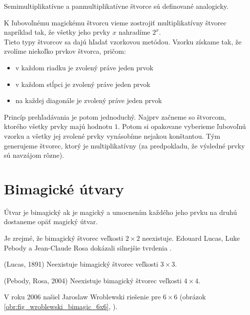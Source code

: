 \begin{note} Semimultiplikatívne a panmultiplikatívne štvorce sú definované analogicky.
\end{note}

K ľubovoľnému magickému štvorcu vieme zostrojiť multiplikatívny štvorec napríklad tak, že všetky jeho prvky $x$ nahradíme $2^x$. \\

Tieto typy štvorcov sa dajú hľadať vzorkovou metódou. Vzorku získame tak, že zvolíme niekoľko prvkov štvorca, pričom:
\begin{itemize}
\item v každom riadku je zvolený práve jeden prvok
\item v každom stĺpci je zvolený práve jeden prvok
\item na každej diagonále je zvolený práve jeden prvok
\end{itemize}

Princíp prehľadávania je potom jednoduchý. Najprv začneme so štvorcom, ktorého všetky prvky majú hodnotu $1$. Potom si opakovane vyberieme ľubovoľnú vzorku a všetky jej zvolené prvky vynásobíme nejakou konštantou. Tým generujeme štvorec, ktorý je multiplikatívny (za predpokladu, že výsledné prvky sú navzájom rôzne). \\

\section{Bimagické útvary}
\begin{definition} Útvar je bimagický ak je magický a umocnením každého jeho prvku na druhú dostaneme opäť magický útvar.
\end{definition}

Je zrejmé, že bimagický štvorec veľkosti $2 \times 2$ neexistuje. Edouard Lucas, Luke Pebody a Jean-Claude Rosa dokázali silnejšie tvrdenia \cite{multimagie}.

\begin{theorem} (Lucas, 1891) Neexistuje bimagický štvorec veľkosti $3 \times 3$.
\end{theorem}

\begin{theorem} (Pebody, Rosa, 2004) Neexistuje bimagický štvorec veľkosti $4 \times 4$.
\end{theorem}

V roku 2006 našiel Jaroslaw Wroblewski riešenie pre $6 \times 6$ (obrázok \ref{obr:fig_wroblewski_bimagic_6x6}, \cite{multimagie}).

